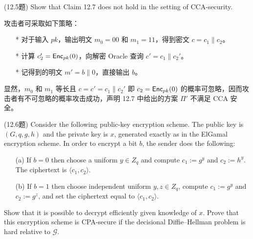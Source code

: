 \begin{questions}
    \question (12.5题) Show that Claim 12.7 does not hold in the setting of CCA-security.

        \begin{solution}
            \newline
            攻击者可采取如下策略：
            \begin{enumerate}
                \item[*] 对于输入 $pk$，输出明文 $m_0=00$ 和 $m_1=11$，得到密文 $c=c_1\parallel{c}_2$。
                \item[*] 计算 $c_2'=\mathsf{Enc}_{pk}(0)$，向解密 Oracle 查询 $c'=c_1\parallel{c}_2'$。
                \item[*] 记得到的明文 $m'=b\parallel0$，直接输出 $b$。
            \end{enumerate}
            显然，$m_0$ 和 $m_1$ 等长且 $c=c'=c_1\parallel{c}_2'$ 即 $c_2=\mathsf{Enc}_{pk}(0)$ 的概率可忽略，因而攻击者有不可忽略的概率攻击成功，声明 12.7 中给出的方案 $\Pi'$ 不满足 CCA 安全。
        \end{solution}

    \question (12.6题) Consider the following public-key encryption scheme. The public key is $(G,q,g,h)$ and the private key is $x$, generated exactly as in the ElGamal encryption scheme. In order to encrypt a bit $b$, the sender does the following:

        \begin{enumerate}
            \item[(a)] If $b=0$ then choose a uniform $y\in{Z_q}$ and compute $c_1:=g^y$ and $c_2:=h^y$. The ciphertext is $\langle{c_1,c_2}\rangle$.
            \item[(b)] If $b=1$ then choose independent uniform $y,z\in{Z_q}$, compute $c_1:=g^y$ and $c_2:=g^z$, and set the ciphertext equal to $\langle{c_1,c_2}\rangle$.
        \end{enumerate}

        Show that it is possible to decrypt efficiently given knowledge of $x$. Prove that this encryption scheme is CPA-secure if the decisional Diffie–Hellman problem is hard relative to $\mathcal{G}$.


\end{questions}
